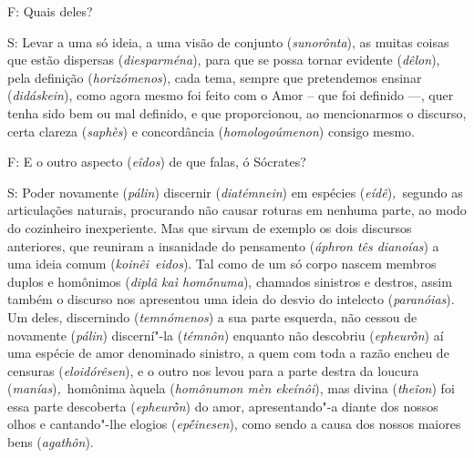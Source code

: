  

\bekker{[265d]} F: Quais deles?

 

S: Levar a uma só ideia, a uma visão de conjunto (\emph{sunorônta}), as
muitas coisas que estão dispersas (\emph{diesparména}), para que se
possa tornar evidente (\emph{dêlon}), pela definição
(\emph{horizómenos}), cada tema, sempre que pretendemos ensinar
(\emph{didáskein}), como agora mesmo foi feito com o Amor -- que foi
definido \mbox{---,} quer tenha sido bem ou mal definido, e que proporcionou, ao
mencionarmos o discurso, certa clareza (\emph{saphès}) e concordância
(\emph{homologoúmenon}) consigo mesmo.

 

F: E o outro aspecto (\emph{eîdos}) de que falas, ó Sócrates?

 

\bekker{[265e]} S: Poder novamente (\emph{pálin}) discernir
(\emph{diatémnein}) em espécies (\emph{eídê})\emph{,}~segundo as
articulações naturais, procurando não causar roturas em nenhuma parte,
ao modo do cozinheiro inexperiente. Mas que sirvam de exemplo os dois
discursos anteriores, que reuniram a insanidade do pensamento
(\emph{áphron tês dianoías}) a uma ideia comum
(\emph{koinêi}~\emph{eidos}). Tal como de um só corpo nascem membros
duplos e homônimos (\emph{diplâ kaì homṓnuma}), chamados sinistros e
destros, \bekker{[266a]} assim também o discurso nos apresentou uma ideia do
desvio do intelecto (\emph{paranóias}). Um deles, discernindo
(\emph{temnómenos}) a sua parte esquerda, não cessou de novamente
(\emph{pálin}) discerní"-la (\emph{témnôn}) enquanto não descobriu
(\emph{epheurṑn}) aí uma espécie de amor denominado sinistro, a quem com
toda a razão encheu de censuras (\emph{eloidórêsen}), e o outro nos
levou para a parte destra da loucura (\emph{manías})\emph{,}~homônima
àquela (\emph{homônumon mèn ekeínôi}), mas divina (\emph{theîon}) foi
essa parte descoberta (\emph{epheurṑn}) do amor, apresentando"-a diante
dos nossos olhos e cantando"-lhe elogios (\emph{epḗinesen}), como sendo a
causa dos nossos maiores bens (\emph{agathôn}).

